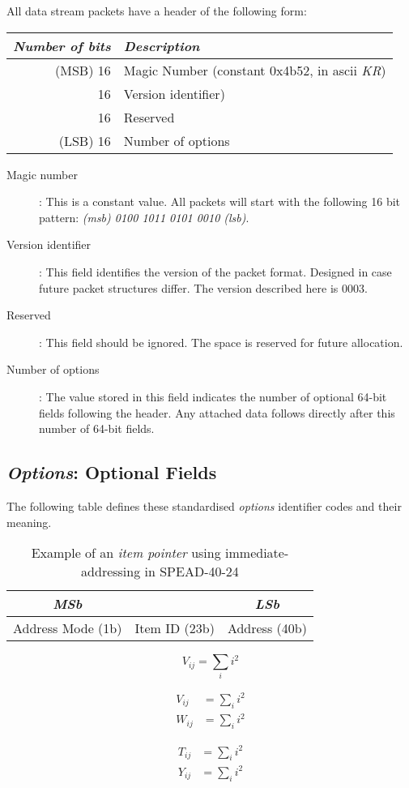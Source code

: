 \documentclass[11pt,english,twoside]{article}
\begin{document}
All data stream packets have a header of the following form:
\begin{table}
\begin{tabular}{|r|l|}
\hline
\emph{Number of bits} & \emph{Description} \\
\hline
(MSB) 16 & Magic Number (constant 0x4b52, in ascii \emph{KR}) \\
      16 & Version identifier) \\
      16 & Reserved \\
(LSB) 16 & Number of options \\
\hline
\end{tabular}
\end{table}

\begin{description}

\item[Magic number]:
This is a constant value. All packets will start with the following 16 bit pattern: \emph{(msb) 0100 1011 0101 0010 (lsb)}.

\item[Version identifier]:
This field identifies the version of the packet format. Designed in case future packet structures differ. The version described here is 0003.

\item[Reserved]:
This field should be ignored. The space is reserved for future allocation.

\item[Number of options]:
The value stored in this field indicates the number of optional 64-bit fields following the header. Any attached data follows directly after this number of 64-bit fields.

\end{description}

\subsection{\emph{Options}: Optional Fields}

The following table defines these standardised \emph{options} identifier codes and their meaning.

\begin{table}
\begin{tabular}{|c|c|c|}
\emph{MSb} && \emph{LSb} \\
\hline
Address Mode (1b) & Item ID (23b) & Address (40b)\\
\hline
\end{tabular}
\caption{Example of an \textit{item pointer} using immediate-addressing in SPEAD-40-24}
\end{table}

\begin{equation}
V_{ij}=\sum_i{i^2}
\end{equation}

\begin{eqnarray}
V_{ij}&=\sum_i{i^2}\\
W_{ij}&=\sum_i{i^2}
\end{eqnarray}

\begin{align}
T_{ij}&=\sum_i{i^2}\\
Y_{ij}&=\sum_i{i^2}
\end{align}
\end{document}
